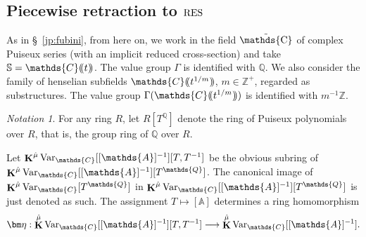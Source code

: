 \documentclass[12pt]{amsart}
\theoremstyle{plain}
\theoremstyle{definition}
\theoremstyle{remark}
\newtheorem{nota}[thm]{Notation}
\numberwithin{equation}{section}
\theoremstyle{plain}
\newcommand{\RV}{\textup{RV}}
\newcommand{\Z}{\mathds{Z}}
\newcommand{\A}{\mathds{A}}
\newcommand{\C}{\mathds{C}}
\newcommand{\Q}{\mathds{Q}}
\newcommand{\gR}{\mathfrak{R}}
\newcommand{\gG}{\mathfrak{G}}
\newcommand{\0}{\emptyset}
\newcommand{\dpar}[1]{%
   (\mkern-4mu (#1 )\mkern-4mu )}
\newcommand{\mdl}[1]{\mathcal{#1}}  %
\newcommand{\fun}{\longrightarrow}
\newcommand{\efun}{\longmapsto}
\newcommand{\mgRV}{{\mu}{\RV}}
\newcommand{\mG}{{\mu}{\Gamma}}
\newcommand{\RES}{\textup{RES}}
\newcommand{\mgRES}{{\mu}{\RES}}
\DeclareMathOperator{\gsk}{\mathbf{K}_+}
\DeclareMathOperator{\ggk}{\mathbf{K}}
\DeclareMathOperator{\fin}{fin}
\newcommand{\var}{\textup{Var}}
\DeclareMathOperator{\puC}{\tilde \C}
\newcommand{\gmv}{\ggk^{\hat \mu}\var_{\C}}
\begin{document}


\subsection{Piecewise retraction to $\RES$}\label{piece:res}

As in \S~\ref{jp:fubini}, from here on, we work in the field $\puC$ of complex Puiseux series (with an implicit reduced cross-section) and take  $\mathbb{S} = \C \dpar{ t }$. The value group $\Gamma$ is identified with $\Q$. We also consider the family of henselian subfields $\C \dpar{ t^{1/m} }$,  $m \in \Z^+$, regarded as substructures. The value group $\Gamma(\C \dpar{ t^{1/m} })$ is identified with $m^{-1} \Z$.



\begin{nota}\label{loc:rings}
For any ring $R$, let $R[T^{\Q}]$ denote the ring of Puiseux polynomials over $R$, that is, the group ring of $\Q$ over $R$.

Let $\gmv[[\A]^{-1}][T,T^{-1}]$ be the obvious subring of $\gmv[[\A]^{-1}][T^{\Q}]$. The canonical image of $\gmv [T^{\Q}]$ in  $\gmv[[\A]^{-1}][T^{\Q}]$ is just denoted as such. The assignment $T \efun [\A]$ determines a ring homomorphism
\begin{equation}\label{pui:laurent}
  \bm \eta : \gmv[[\A]^{-1}][T,T^{-1}] \fun \gmv[[\A]^{-1}].
\end{equation}
\end{nota}

\end{document}
